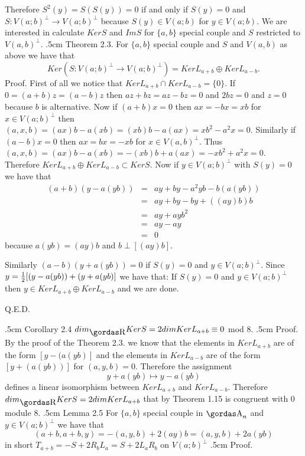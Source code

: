 Therefore $S^{2}(y)=S(S(y))=0$ if and only if $S(y)=0$ and
$S:V(a;b)^{\perp}\rightarrow V(a;b)^{\perp}$ because $S(y)\in V(a;b)$ for $y\in V(a;b)$.
We are interested in calculate $Ker S$ and $Im S$ for $\{a,b\}$ special couple
and $S$ restricted to $V(a,b)^{\perp}$.
\vglue.5cm
\noindent
{\bsbf Theorem 2.3.} For $\{a,b\}$ special couple and $S$ and $V(a,b)$ as above
we have that 
$$Ker(S:V(a;b)^{\perp}\rightarrow V(a;b)^{\perp})=Ker L_{a+b}\oplus Ker L_{a-b}.$$
{\bsbf Proof.} First of all we notice that $Ker L_{a+b}\cap Ker L_{a-b}=\{0\}$.
If $0=(a+b)z=(a-b)z$ then $az+bz=az-bz=0$ and $2bz=0$ and $z=0$ because
$b$ is alternative. Now if $(a+b)x=0$ then $ax=-bx=xb$ for $x\in V(a;b)^{\perp}$
then $(a,x,b)=(ax)b-a(xb)=(xb)b-a(ax)=xb^{2}-a^{2}x=0$. Similarly if
$(a-b)x=0$ then $ax=bx=-xb$ for $x\in V(a,b)^{\perp}$. Thus
$(a,x,b)=(ax)b-a(xb)=-(xb)b+a(ax)=-xb^{2}+a^{2}x=0$. Therefore
$Ker L_{a+b}\oplus Ker L_{a-b}\subset Ker S$.
Now if $y\in V(a;b)^{\perp}$ with $S(y)=0$ we have that
\begin{eqnarray*}
(a+b)(y-a(yb))&=&ay+by-a^{2}yb-b(a(yb))\\
&=&ay+by-by+((ay)b)b\\
&=&ay+ayb^{2}\\
&=&ay-ay\\
&=&0
\end{eqnarray*}
because $a(yb)=(ay)b$ and $b\perp[(ay)b]$.
\par 
Similarly $(a-b)(y+a(yb))=0$ if $S(y)=0$ and $y\in V(a;b)^{\perp}$. Since
$y={ 1\over  2}[(y-a(yb))+(y+a(yb)]$ we have that: If $S(y)=0$ and
$y\in  V(a;b)^{\perp}$ then $y\in Ker L_{a+b}\oplus Ker L_{a-b}$ and we are done.
\begin{flushright}
Q.E.D.
\end{flushright}
\vglue.5cm
\noindent
{\bsbf Corollary 2.4} $dim_{\erre} Ker S=2 dim Ker L_{a+b}\equiv 0$ mod 8.
\vglue.5cm
\noindent
{\bsbf Proof.} By the proof of the Theorem 2.3. we know that the elements in
$Ker L_{a+b}$ are of the form $[y-(a(yb)]$ and the elements in $Ker L_{a-b}$ are
of the form $[y+(a(yb))]$ for $(a,y,b)=0$. Therefore the assignment
$$y+a(yb)\mapsto y-a(yb)$$
defines a linear isomorphism between $Ker L_{a+b}$ and $Ker L_{a-b}$.
Therefore $dim_{\erre} Ker S=2 dim Ker L_{a+b}$ that by Theorem 1.15 is congruent
with $0$ module $8$.
\vglue.5cm
\noindent
{\bsbf Lemma 2.5} For $\{a,b\}$ special couple in $\a_{n}$ and $y\in V(a;b)^{\perp}$ 
we have that
$$(a+b,a+b,y)=-(a,y,b)+2(ay)b=(a,y,b)+2a(yb)$$
in short $T_{a+b}=-S+2R_{b}L_{a}=S+2L_{a}R_{b}$ on $V(a;b)^{\perp}$
\vglue.5cm
\noindent
{\bsbf Proof.}
